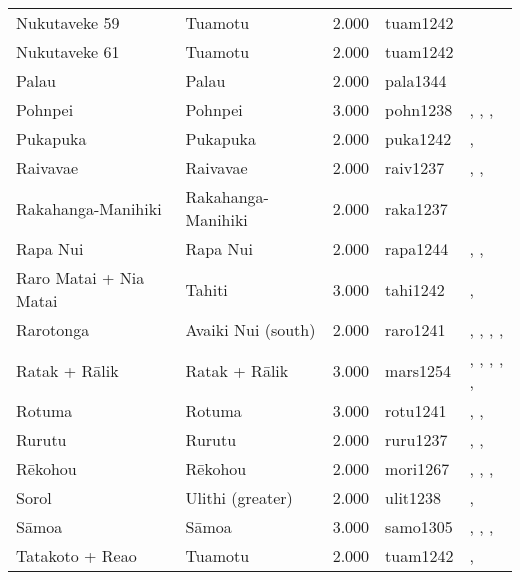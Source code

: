 \begin{longtable}{p{1.8cm}p{1.8cm}p{1.8cm}p{2cm}p{7cm}}
  Nukutaveke 59 & Tuamotu & 2.000 & tuam1242 & \citet{emory1975material} \\ 
  Nukutaveke 61 & Tuamotu & 2.000 & tuam1242 & \citet{emory1975material} \\ 
  Palau & Palau & 2.000 & pala1344 & \citet{force1960leadership} \\ 
  Pohnpei & Pohnpei & 3.000 & pohn1238 & \citet{hanlon2019upon}, \citet{haun1984prehistoric}, \citet{raynor1991indigenous}, \citet{riesenberg1968native} \\ 
  Pukapuka & Pukapuka & 2.000 & puka1242 & \citet{beagleholeandbeaglehole1938}, \citet{macgregor1935} \\ 
  Raivavae & Raivavae & 2.000 & raiv1237 & \citet{aitken1930ethnology}, \citet{bollt2008excavations}, \citet{edwards2003archaeological} \\ 
  Rakahanga-Manihiki & Rakahanga-Manihiki & 2.000 & raka1237 & \citet{buck1932a} \\ 
  Rapa Nui & Rapa Nui & 2.000 & rapa1244 & \citet{sahlins1958social}, \citet{kirch1984evolution}, \citet{metraux_1971} \\ 
  Raro Matai + Nia Matai & Tahiti & 3.000 & tahi1242 & \citet{oliver2019ancient}, \citet{oliver2019ancient} \\ 
  Rarotonga & Avaiki Nui (south) & 2.000 & raro1241 & \citet{bellwood1971varieties}, \citet{buck1934}, \citet{crocombe_1967}, \citet{hayes1981cook}, \citet{walter1996} \\ 
  Ratak + Rālik & Ratak + Rālik & 3.000 & mars1254 & \citet{carruci1991marshall}, \citet{carruci1991marshall}, \citet{erdland1914}, \citet{erdland1914}, \citet{williamson_1982}, \citet{williamson_1982} \\ 
  Rotuma & Rotuma & 3.000 & rotu1241 & \citet{gardiner1898natives}, \citet{howard1963conservatism}, \citet{howard1991} \\ 
  Rurutu & Rurutu & 2.000 & ruru1237 & \citet{aitken1930ethnology}, \citet{bollt2008excavations}, \citet{edwards2003archaeological} \\ 
  Rēkohou & Rēkohou & 2.000 & mori1267 & \citet{sahlins1958social}, \citet{buck1952}, \citet{kirch1984evolution}, \citet{van1995maori} \\ 
  Sorol & Ulithi (greater) & 2.000 & ulit1238 & \citet{lessa1950}, \citet{lessa1966} \\ 
  Sāmoa & Sāmoa & 3.000 & samo1305 & \citet{sahlins1958social}, \citet{buck1930}, \citet{keesing1934}, \citet{watters_1958} \\ 
  Tatakoto + Reao & Tuamotu & 2.000 & tuam1242 & \citet{emory1975material}, \citet{emory1975material} \\ 

\end{longtable}
